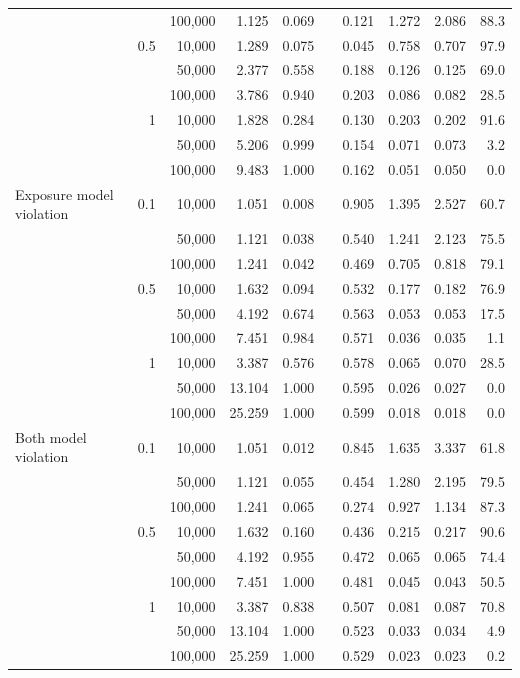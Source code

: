 \documentclass[12pt]{article}
\begin{document}
{\begin{table}[ht]
{\begin{tabular}{lrrrrrrrrr}
		&       & 100,000 & 1.125  & 0.069    &  & 0.121 & 1.272 & 2.086 & 88.3 \\
		& 0.5   & 10,000 & 1.289  & 0.075    &  & 0.045 & 0.758 & 0.707 & 97.9 \\
		&       & 50,000 & 2.377  & 0.558    &  & 0.188 & 0.126 & 0.125 & 69.0 \\
		&       & 100,000 & 3.786  & 0.940    &  & 0.203 & 0.086 & 0.082 & 28.5 \\
		& 1     & 10,000 & 1.828  & 0.284    &  & 0.130 & 0.203 & 0.202 & 91.6 \\
		&       & 50,000 & 5.206  & 0.999    &  & 0.154 & 0.071 & 0.073 & 3.2  \\
		&       & 100,000 & 9.483  & 1.000    &  & 0.162 & 0.051 & 0.050 & 0.0  \\ \hline 
		Exposure model violation  & 0.1   & 10,000 & 1.051  & 0.008    &  & 0.905 & 1.395 & 2.527 & 60.7 \\
		&       & 50,000 & 1.121  & 0.038    &  & 0.540 & 1.241 & 2.123 & 75.5 \\
		&       & 100,000 & 1.241  & 0.042    &  & 0.469 & 0.705 & 0.818 & 79.1 \\
		& 0.5   & 10,000 & 1.632  & 0.094    &  & 0.532 & 0.177 & 0.182 & 76.9 \\
		&       & 50,000 & 4.192  & 0.674    &  & 0.563 & 0.053 & 0.053 & 17.5 \\
		&       & 100,000 & 7.451  & 0.984    &  & 0.571 & 0.036 & 0.035 & 1.1  \\
		& 1     & 10,000 & 3.387  & 0.576    &  & 0.578 & 0.065 & 0.070 & 28.5 \\
		&       & 50,000 & 13.104 & 1.000    &  & 0.595 & 0.026 & 0.027 & 0.0  \\
		&       & 100,000 & 25.259 & 1.000    &  & 0.599 & 0.018 & 0.018 & 0.0  \\ \hline 
		Both model violation     & 0.1   & 10,000 & 1.051  & 0.012    &  & 0.845 & 1.635 & 3.337 & 61.8 \\
		&       & 50,000 & 1.121  & 0.055    &  & 0.454 & 1.280 & 2.195 & 79.5 \\
		&       & 100,000 & 1.241  & 0.065    &  & 0.274 & 0.927 & 1.134 & 87.3 \\
		& 0.5   & 10,000 & 1.632  & 0.160    &  & 0.436 & 0.215 & 0.217 & 90.6 \\
		&       & 50,000 & 4.192  & 0.955    &  & 0.472 & 0.065 & 0.065 & 74.4 \\
		&       & 100,000 & 7.451  & 1.000    &  & 0.481 & 0.045 & 0.043 & 50.5 \\
		& 1     & 10,000 & 3.387  & 0.838    &  & 0.507 & 0.081 & 0.087 & 70.8 \\
		&       & 50,000 & 13.104 & 1.000    &  & 0.523 & 0.033 & 0.034 & 4.9  \\
		&       & 100,000 & 25.259 & 1.000    &  & 0.529 & 0.023 & 0.023 & 0.2  \\\hline 
	\end{tabular}}
\end{table}



}
\end{document}
